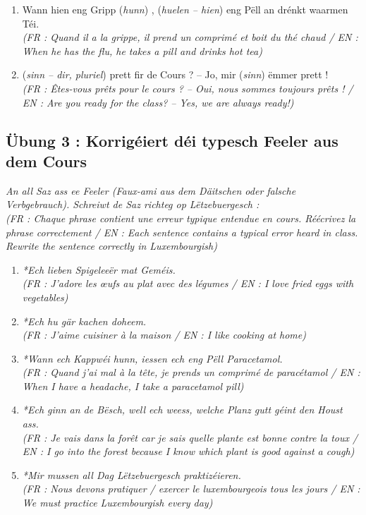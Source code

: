 \begin{enumerate}
    \item Wann hien eng Gripp (\textit{hunn}) \underline{\hspace{2.5cm}}, (\textit{huelen -- hien}) \underline{\hspace{2.5cm}} eng Pëll an drénkt waarmen Téi. \\
    \small\textit{(FR : Quand il a la grippe, il prend un comprimé et boit du thé chaud / EN : When he has the flu, he takes a pill and drinks hot tea)}
    \item (\textit{sinn -- dir, pluriel}) \underline{\hspace{2.5cm}} prett fir de Cours ? -- Jo, mir (\textit{sinn}) \underline{\hspace{2.5cm}} ëmmer prett ! \\
    \small\textit{(FR : Êtes-vous prêts pour le cours ? -- Oui, nous sommes toujours prêts ! / EN : Are you ready for the class? -- Yes, we are always ready!)}
\end{enumerate}

\subsection*{Übung 3 : Korrigéiert déi typesch Feeler aus dem Cours}
\textit{An all Saz ass ee Feeler (Faux-ami aus dem Däitschen oder falsche Verbgebrauch). Schreiwt de Saz richteg op Lëtzebuergesch :} \\
\textit{\small(FR : Chaque phrase contient une erreur typique entendue en cours. Réécrivez la phrase correctement / EN : Each sentence contains a typical error heard in class. Rewrite the sentence correctly in Luxembourgish)}

\begin{enumerate}
    \item \textit{*Ech lieben Spigeleeër mat Geméis.} \\
    \small\textit{(FR : J'adore les œufs au plat avec des légumes / EN : I love fried eggs with vegetables)}
    \item \textit{*Ech hu gär kachen doheem.} \\
    \small\textit{(FR : J'aime cuisiner à la maison / EN : I like cooking at home)}
    \item \textit{*Wann ech Kappwéi hunn, iessen ech eng Pëll Paracetamol.} \\
    \small\textit{(FR : Quand j'ai mal à la tête, je prends un comprimé de paracétamol / EN : When I have a headache, I take a paracetamol pill)}
    \item \textit{*Ech ginn an de Bësch, well ech weess, welche Planz gutt géint den Houst ass.} \\
    \small\textit{(FR : Je vais dans la forêt car je sais quelle plante est bonne contre la toux / EN : I go into the forest because I know which plant is good against a cough)}
    \item \textit{*Mir mussen all Dag Lëtzebuergesch praktizéieren.} \\
    \small\textit{(FR : Nous devons pratiquer / exercer le luxembourgeois tous les jours / EN : We must practice Luxembourgish every day)}
\end{enumerate}

